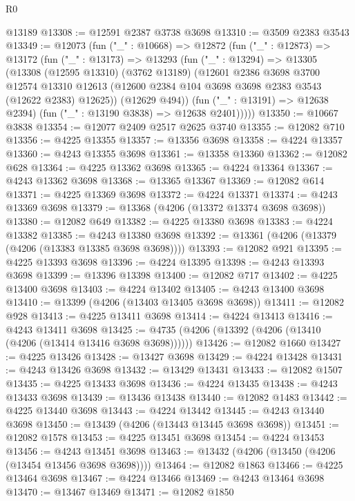 \begin{lexlean}{R0}
\begin{coremodule}
    @13189
@13308 := @12591 @2387 @3738 @3698
@13310 := @3509 @2383 @3543
@13349 := @12073
    (fun ("_" : @10668) =>
    @12872
      (fun ("_" : @12873) =>
      @13172
        (fun ("_" : @13173) =>
        @13293
          (fun ("_" : @13294) =>
          @13305
            (@13308
              (@12595 @13310)
              (@3762 @13189)
              (@12601
                @2386
                @3698
                @3700
                @12574
                @13310
                @12613
                (@12600 @2384 @104 @3698 @3698 @2383 @3543 (@12622 @2383) @12625))
              (@12629 @494))
            (fun ("_" : @13191) => @12638 @2394)
            (fun ("_" : @13190 @3838) => @12638 @2401)))))
@13350 := @10667 @3838
@13354 := @12077 @2409 @2517 @2625 @3740
@13355 := @12082 @710
@13356 := @4225 @13355
@13357 := @13356 @3698
@13358 := @4224 @13357
@13360 := @4243 @13355 @3698
@13361 := @13358 @13360
@13362 := @12082 @628
@13364 := @4225 @13362 @3698
@13365 := @4224 @13364
@13367 := @4243 @13362 @3698
@13368 := @13365 @13367
@13369 := @12082 @614
@13371 := @4225 @13369 @3698
@13372 := @4224 @13371
@13374 := @4243 @13369 @3698
@13379 := @13368 (@4206 (@13372 @13374 @3698 @3698))
@13380 := @12082 @649
@13382 := @4225 @13380 @3698
@13383 := @4224 @13382
@13385 := @4243 @13380 @3698
@13392 := @13361 (@4206 (@13379 (@4206 (@13383 @13385 @3698 @3698))))
@13393 := @12082 @921
@13395 := @4225 @13393 @3698
@13396 := @4224 @13395
@13398 := @4243 @13393 @3698
@13399 := @13396 @13398
@13400 := @12082 @717
@13402 := @4225 @13400 @3698
@13403 := @4224 @13402
@13405 := @4243 @13400 @3698
@13410 := @13399 (@4206 (@13403 @13405 @3698 @3698))
@13411 := @12082 @928
@13413 := @4225 @13411 @3698
@13414 := @4224 @13413
@13416 := @4243 @13411 @3698
@13425 := @4735 (@4206 (@13392 (@4206 (@13410 (@4206 (@13414 @13416 @3698 @3698))))))
@13426 := @12082 @1660
@13427 := @4225 @13426
@13428 := @13427 @3698
@13429 := @4224 @13428
@13431 := @4243 @13426 @3698
@13432 := @13429 @13431
@13433 := @12082 @1507
@13435 := @4225 @13433 @3698
@13436 := @4224 @13435
@13438 := @4243 @13433 @3698
@13439 := @13436 @13438
@13440 := @12082 @1483
@13442 := @4225 @13440 @3698
@13443 := @4224 @13442
@13445 := @4243 @13440 @3698
@13450 := @13439 (@4206 (@13443 @13445 @3698 @3698))
@13451 := @12082 @1578
@13453 := @4225 @13451 @3698
@13454 := @4224 @13453
@13456 := @4243 @13451 @3698
@13463 := @13432 (@4206 (@13450 (@4206 (@13454 @13456 @3698 @3698))))
@13464 := @12082 @1863
@13466 := @4225 @13464 @3698
@13467 := @4224 @13466
@13469 := @4243 @13464 @3698
@13470 := @13467 @13469
@13471 := @12082 @1850

\end{coremodule}
\end{lexlean}
